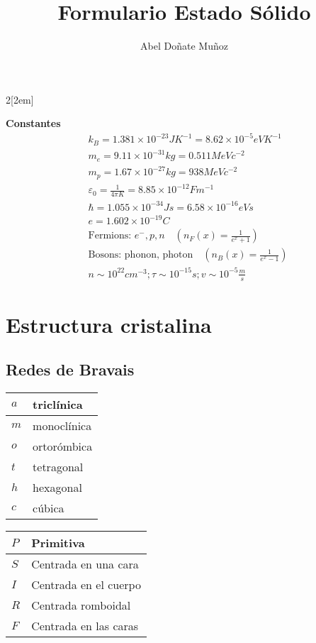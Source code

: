 \documentclass[leqno]{article}
\title{Formulario Estado Sólido}
\author{Abel Doñate Muñoz}
\date{}
\begin{document}
\begin{multicols}{2}[\columnsep2em]

\textbf{Constantes}
\begin{align*}
&k_B = 1.381\times 10^{-23}JK^{-1} = 8.62\times 10^{-5}eVK^{-1}\\
&m_e = 9.11\times 10^{-31}kg = 0.511MeVc^{-2}\\
&m_p = 1.67\times 10^{-27}kg = 938MeVc^{-2}\\
&\varepsilon _0 = \frac{1}{4\pi K} = 8.85\times 10^{-12} Fm^{-1}\\
&\hbar = 1.055\times 10^{-34} Js = 6.58\times 10^{-16}eVs \\
&e = 1.602 \times 10^{-19} C\\
&\text{Fermions: }e^-, p, n \quad (n_F(x) = \frac{1}{e ^{x}+1})\\
& \text{Bosons: phonon, photon} \quad (n_B(x)=\frac{1}{e ^{x} -1})\\
& n\sim 10 ^{22}cm ^{-3}; \tau \sim 10 ^{-15}s; v\sim 10 ^{-5}\frac{m}{s}
\end{align*}



\section{Estructura cristalina}
\subsection{Redes de Bravais}
\begin{minipage}{0.45\columnwidth}
\begin{center}
\begin{tabular}{|l|l|}
\hline
$a$ & triclínica  \\ \hline
$m$ & monoclínica\\ \hline
$o$ & ortorómbica\\ \hline
$t$ & tetragonal \\ \hline
$h$ & hexagonal\\ \hline
$c$ & cúbica \\ \hline
\end{tabular}
\end{center}
\end{minipage}
\begin{minipage}{0.45\columnwidth}
\begin{center}
\begin{tabular}{|l|l|}
\hline
$P$ & Primitiva \\\hline
$S$ & Centrada en una cara\\\hline
$I$ & Centrada en el cuerpo\\\hline
$R$ & Centrada romboidal\\\hline
$F$ & Centrada en las caras \\\hline
\end{tabular}
\end{center}
\end{minipage}


\end{multicols}
\end{document}
